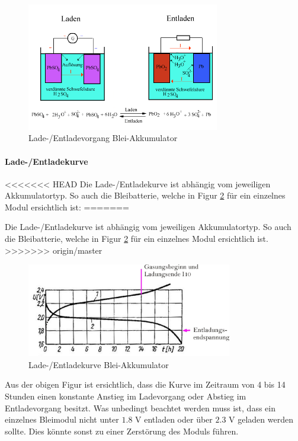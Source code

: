 \begin{figure}[h!]
	\centering
		\includegraphics[width=0.75\textwidth]{images/pb_akku.PNG}
	\caption{Lade-/Entladevorgang Blei-Akkumulator \cite{pb_akku_ent_lade}}
	\label{fig:pb_akku}
\end{figure}

\newpage

\paragraph{Lade-/Entladekurve}
<<<<<<< HEAD
Die Lade-/Entladekurve ist abhängig vom jeweiligen Akkumulatortyp. So auch die Bleibatterie, welche in Figur \ref{fig:pb_akku_kurve} für ein einzelnes Modul ersichtlich ist:
=======

Die Lade-/Entladekurve ist abhängig vom jeweiligen Akkumulatortyp. So auch die Bleibatterie, welche in Figur \ref{fig:pb_akku_kurve} für ein einzelnes Modul ersichtlich ist.
>>>>>>> origin/master

\begin{figure}[h!]
	\centering
		\includegraphics[width=0.8\textwidth]{images/pb_akku_kurve.jpg}
	\caption{Lade-/Entladekurve Blei-Akkumulator \cite{pb_akku_kurve}}
	\label{fig:pb_akku_kurve}
\end{figure}

Aus der obigen Figur ist ersichtlich, dass die Kurve im Zeitraum von 4 bis 14 Stunden einen konstante Anstieg im Ladevorgang oder Abstieg im Entladevorgang besitzt. Was unbedingt beachtet werden muss ist, dass ein einzelnes Bleimodul nicht unter $1.8$ V entladen oder über $2.3$ V geladen werden sollte. Dies könnte sonst zu einer Zerstörung des Moduls führen.

\newpage